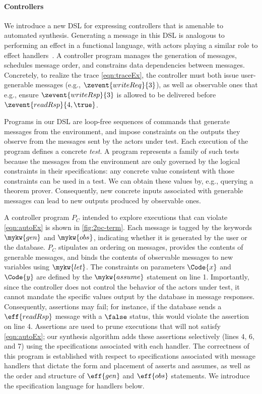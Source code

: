 \paragraph{Controllers}
We introduce a new DSL for expressing controllers that is amenable to
automated synthesis. Generating a message in this DSL is analogous to
performing an effect in a functional language, with actors playing a
similar role to effect handlers~\cite{BP15}. A controller program
manages the generation of messages, schedules message order, and
constrains data dependencies between messages.  Concretely, to realize
the trace \ref{eqn:traceEx}, the controller must both issue
user-generable messages (e.g., $\zevent{writeReq}{3}$), as well as
observable ones that e.g., ensure $\zevent{writeRsp}{3}$ is allowed to be
delivered before $\zevent{readRsp}{4,\true}$.

Programs in our DSL are loop-free sequences of commands that generate
messages from the environment, and impose constraints on the outputs
they observe from the messages sent by the actors under test.  Each
execution of the program defines a concrete \emph{test}.  A program
represents a family of such tests because the messages from the
environment are only governed by the logical constraints in their
specifications: any concrete value consistent with those constraints
can be used in a test. We can obtain these values by, e.g., querying a
theorem prover.  Consequently, new concrete inputs associated with
generable messages can lead to new outputs produced by observable
ones.

A controller program $P_{C}$ intended to explore executions that can
violate \ref{eqn:autoEx} is shown in \autoref{fig:2pc-term}.  Each
message is tagged by the keywords $\mykw{gen}$ and $\mykw{obs}$,
indicating whether it is generated by the user or the database.
$P_{C}$ stipulates an ordering on messages, provides the contents of
generable messages, and binds the contents of observable messages to
new variables using $\mykw{let}$. The constraints on parameters
$\Code{x}$ and $\Code{y}$ are defined by the $\mykw{assume}$ statement
on line 1.  Importantly, since the controller does not control the
behavior of the actors under test, it cannot mandate the specific
values output by the database in message responses. Consequently,
assertions may fail; for instance, if the database sends a
$\eff{readRsp}$ message with a $\false$ status, this would violate the
assertion on line 4. Assertions are used to prune executions that will
not satisfy \ref{eqn:autoEx}; our synthesis algorithm adds these
assertions selectively (lines 4, 6, and 7) using the \PAT{} specifications
associated with each handler.
The correctness of this program is
established with respect to specifications associated with message
handlers that dictate the form and placement of asserts and assumes,
as well as the order and structure of $\eff{gen}$ and $\eff{obs}$
statements.  We introduce the specification language for handlers
below.

